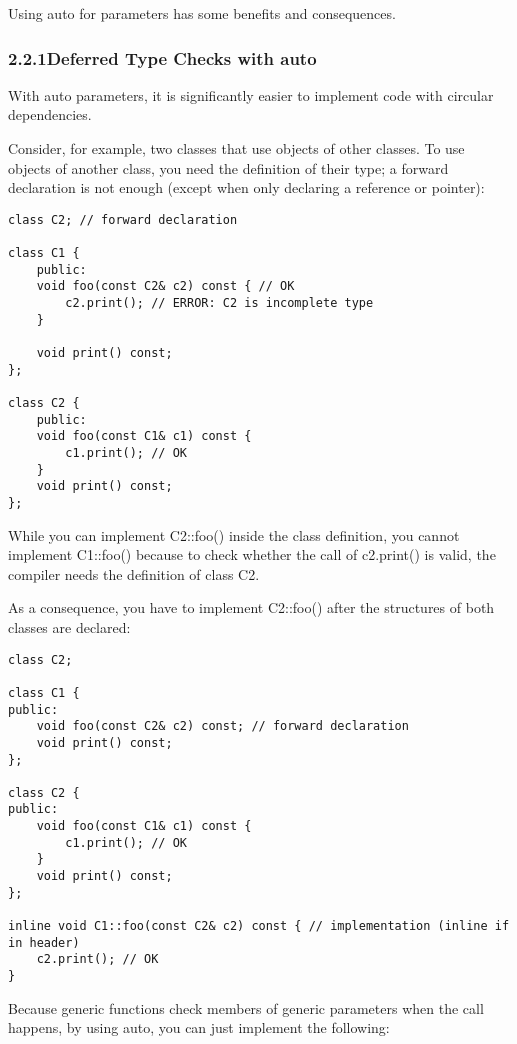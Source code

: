
Using auto for parameters has some benefits and consequences.

\subsubsection*{ 2.2.1\hspace{0.2cm}Deferred Type Checks with auto}

With auto parameters, it is significantly easier to implement code with circular dependencies.

Consider, for example, two classes that use objects of other classes. To use objects of another class, you need the definition of their type; a forward declaration is not enough (except when only declaring a reference or pointer):

\begin{lstlisting}[style=styleCXX]
class C2; // forward declaration

class C1 {
	public:
	void foo(const C2& c2) const { // OK
		c2.print(); // ERROR: C2 is incomplete type
	}
	
	void print() const;
};

class C2 {
	public:
	void foo(const C1& c1) const {
		c1.print(); // OK
	}
	void print() const;
};
\end{lstlisting}

While you can implement C2::foo() inside the class definition, you cannot implement C1::foo() because to check whether the call of c2.print() is valid, the compiler needs the definition of class C2.

As a consequence, you have to implement C2::foo() after the structures of both classes are declared:

\begin{lstlisting}[style=styleCXX]
class C2;

class C1 {
public:
	void foo(const C2& c2) const; // forward declaration
	void print() const;
};

class C2 {
public:
	void foo(const C1& c1) const {
		c1.print(); // OK
	}
	void print() const;
};

inline void C1::foo(const C2& c2) const { // implementation (inline if in header)
	c2.print(); // OK
}
\end{lstlisting}

Because generic functions check members of generic parameters when the call happens, by using auto, you can just implement the following:


